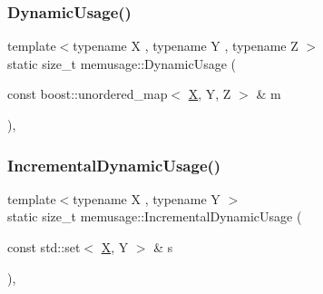 \mbox{\label{namespacememusage_a6ad91da241c7c9802976b38e60091967}} 
\subsubsection{\texorpdfstring{Dynamic\+Usage()}{DynamicUsage()}\hspace{0.1cm}{\footnotesize\ttfamily [18/18]}}
{\footnotesize\ttfamily template$<$typename X , typename Y , typename Z $>$ \\
static size\+\_\+t memusage\+::\+Dynamic\+Usage (\begin{DoxyParamCaption}\item[{const boost\+::unordered\+\_\+map$<$ \mbox{\hyperlink{net_8cpp_a826edd40636cbaa44266b97c8c6a4fa3}{X}}, Y, Z $>$ \&}]{m }\end{DoxyParamCaption})\hspace{0.3cm}{\ttfamily [inline]}, {\ttfamily [static]}}

\mbox{\label{namespacememusage_adb94a858deacb691d493a604f572a9a9}} 
\subsubsection{\texorpdfstring{Incremental\+Dynamic\+Usage()}{IncrementalDynamicUsage()}\hspace{0.1cm}{\footnotesize\ttfamily [1/2]}}
{\footnotesize\ttfamily template$<$typename X , typename Y $>$ \\
static size\+\_\+t memusage\+::\+Incremental\+Dynamic\+Usage (\begin{DoxyParamCaption}\item[{const std\+::set$<$ \mbox{\hyperlink{net_8cpp_a826edd40636cbaa44266b97c8c6a4fa3}{X}}, Y $>$ \&}]{s }\end{DoxyParamCaption})\hspace{0.3cm}{\ttfamily [inline]}, {\ttfamily [static]}}

\mbox{\label{namespacememusage_ac3378c097b343ce1539a862fa273b8da}} 
